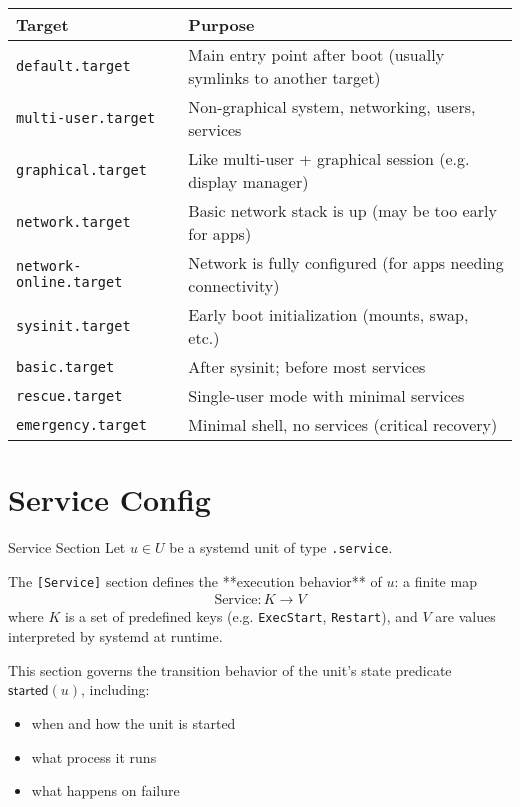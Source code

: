 \documentclass[openany, 12pt]{book}
\begin{document}
\begin{tabular}{@{}ll@{}}
	\toprule
	\textbf{Target}                & \textbf{Purpose}                                                 \\
	\midrule
	\texttt{default.target}        & Main entry point after boot (usually symlinks to another target) \\
	\texttt{multi-user.target}     & Non-graphical system, networking, users, services                \\
	\texttt{graphical.target}      & Like multi-user + graphical session (e.g. display manager)       \\
	\texttt{network.target}        & Basic network stack is up (may be too early for apps)            \\
	\texttt{network-online.target} & Network is fully configured (for apps needing connectivity)      \\
	\texttt{sysinit.target}        & Early boot initialization (mounts, swap, etc.)                   \\
	\texttt{basic.target}          & After sysinit; before most services                              \\
	\texttt{rescue.target}         & Single-user mode with minimal services                           \\
	\texttt{emergency.target}      & Minimal shell, no services (critical recovery)                   \\
	\bottomrule
\end{tabular}


\chapter{Service Config}

\begin{definition}{Service Section}{}
	Let $u \in U$ be a systemd unit of type \texttt{.service}.

	The \texttt{[Service]} section defines the **execution behavior** of $u$:
	a finite map
	\begin{align*}
		\text{Service} : K \to V
	\end{align*}
	where $K$ is a set of predefined keys (e.g. \texttt{ExecStart}, \texttt{Restart}),
	and $V$ are values interpreted by systemd at runtime.

	This section governs the transition behavior of the unit’s state predicate $\mathsf{started}(u)$,
	including:
	\begin{itemize}
		\item when and how the unit is started
		\item what process it runs
		\item what happens on failure
	\end{itemize}
\end{definition}
\end{document}

